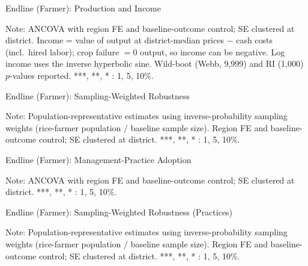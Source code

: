 \documentclass[aspectratio=169]{beamer}
\begin{document}
\begin{frame}{Endline (Farmer): Production and Income}
	\centering
	\scalebox{0.46}{}
	\begin{tablenotes}
		\scriptsize
		\item Note: ANCOVA with region FE and baseline-outcome control; SE clustered at district.
		Income = value of output at district-median prices $-$ cash costs (incl.\ hired labor);
		crop failure $=0$ output, so income can be negative. Log income uses the inverse
		hyperbolic sine. Wild-boot (Webb, 9{,}999) and RI (1{,}000) $p$-values reported. ***, **, * : 1, 5, 10\%.
	\end{tablenotes}
\end{frame}

\begin{frame}{Endline (Farmer): Sampling-Weighted Robustness}
	\centering
	\scalebox{0.46}{}
	\begin{tablenotes}
		\scriptsize
		\item Note: Population-representative estimates using inverse-probability sampling weights
		(rice-farmer population $/$ baseline sample size). Region FE and baseline-outcome control;
		SE clustered at district. ***, **, * : 1, 5, 10\%.
	\end{tablenotes}
\end{frame}

\begin{frame}{Endline (Farmer): Management-Practice Adoption}
	\centering
	\scalebox{0.5}{}
	\begin{tablenotes}
		\scriptsize
		\item Note: ANCOVA with region FE and baseline-outcome control; SE clustered at district.
		***, **, * : 1, 5, 10\%.
	\end{tablenotes}
\end{frame}

\begin{frame}{Endline (Farmer): Sampling-Weighted Robustness (Practices)}
	\centering
	\scalebox{0.5}{}
	\begin{tablenotes}
		\scriptsize
		\item Note: Population-representative estimates using inverse-probability sampling weights
		(rice-farmer population $/$ baseline sample size). Region FE and baseline-outcome control;
		SE clustered at district. ***, **, * : 1, 5, 10\%.
	\end{tablenotes}
\end{frame}
\end{document}
